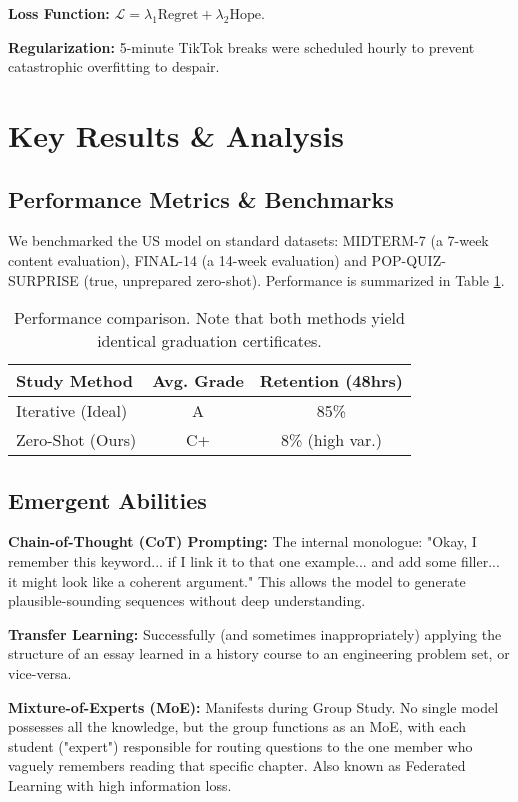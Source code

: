\documentclass[11pt]{article}
\newcommand{\defitem}[1]{\vspace{0.8em}\noindent\textbf{#1}}
\begin{document}
\defitem{Loss Function:} $\mathcal{L} = \lambda_1 \text{Regret} + \lambda_2 \text{Hope}$.

\defitem{Regularization:} 5-minute TikTok breaks were scheduled hourly to prevent catastrophic overfitting to despair.

\section{Key Results \& Analysis}
\subsection{Performance Metrics \& Benchmarks}
We benchmarked the US model on standard datasets: MIDTERM-7 (a 7-week content evaluation), FINAL-14 (a 14-week evaluation) and POP-QUIZ-SURPRISE (true, unprepared zero-shot). Performance is summarized in Table \ref{tab:results}.

\begin{table}[h!]
\centering
\caption{Performance comparison. Note that both methods yield identical graduation certificates.}
\label{tab:results}
\begin{tabular}{@{}lcc@{}}
\toprule
\textbf{Study Method} & \textbf{Avg. Grade} & \textbf{Retention (48hrs)} \\ \midrule
Iterative (Ideal)   & A                   & 85\%                       \\
Zero-Shot (Ours)    & C+                  & 8\% (high var.)          \\ \bottomrule
\end{tabular}
\end{table}

\subsection{Emergent Abilities}
\defitem{Chain-of-Thought (CoT) Prompting:} The internal monologue: "Okay, I remember this keyword... if I link it to that one example... and add some filler... it might look like a coherent argument." This allows the model to generate plausible-sounding sequences without deep understanding.

\defitem{Transfer Learning:} Successfully (and sometimes inappropriately) applying the structure of an essay learned in a history course to an engineering problem set, or vice-versa.

\defitem{Mixture-of-Experts (MoE):} Manifests during Group Study. No single model possesses all the knowledge, but the group functions as an MoE, with each student ("expert") responsible for routing questions to the one member who vaguely remembers reading that specific chapter. Also known as Federated Learning with high information loss.
\end{document}
